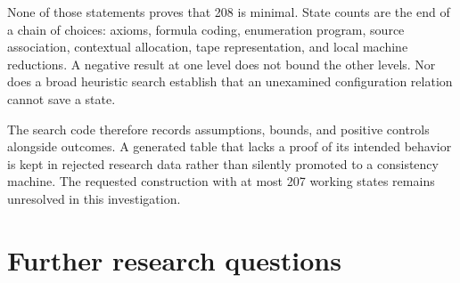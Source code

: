 \documentclass[11pt,a4paper]{article}
\begin{document}
None of those statements proves that 208 is minimal. State counts are the
end of a chain of choices: axioms, formula coding, enumeration program,
source association, contextual allocation, tape representation, and local
machine reductions. A negative result at one level does not bound the
other levels. Nor does a broad heuristic search establish that an
unexamined configuration relation cannot save a state.

The search code therefore records assumptions, bounds, and positive controls
alongside outcomes. A generated table that lacks a proof of its intended
behavior is kept in rejected research data rather than silently promoted
to a consistency machine. The requested construction with at most 207
working states remains unresolved in this investigation.

\section{Further research questions}\label{sec:further}
\end{document}

